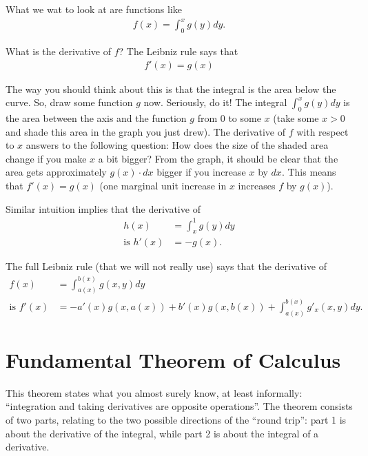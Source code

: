 \documentclass{article}
\begin{document}
What we wat to look at are functions like
\begin{align*}
	f(x) = \int_0^x g(y) dy.
\end{align*}

What is the derivative of $f$? The Leibniz rule says that
\begin{align*}
	f'(x)=g(x)
\end{align*}

The way you should think about this is that the integral is the area below the curve. So, draw some function $g$ now. Seriously, do it! The integral $\int_0^x g(y) dy$ is the area between the axis and the function $g$ from $0$ to some $x$ (take some $x > 0$ and shade this area in the graph you just drew). The derivative of $f$ with respect to $x$ answers to the following question: How does the size of the shaded area change if you make $x$ a bit bigger? From the graph, it should be clear that the area gets approximately $g(x) \cdot dx$ bigger if you increase $x$ by $dx$. This means that $f'(x) = g(x)$ (one marginal unit increase in $x$ increases $f$ by $g(x)$).

Similar intuition implies that the derivative of
\begin{align*}
	h(x) &= \int_x^1 g(y) dy
	\\
	\text{is }
	h'(x) &= -g(x).
\end{align*}

The full Leibniz rule (that we will not really use) says that the derivative of
\begin{align*}
	f(x) &= \int_{a(x)}^{b(x)} g(x,y) dy
	\\
	\text{is } f'(x) &= -a'(x)g(x,a(x)) + b'(x) g(x,b(x)) + \int_{a(x)}^{b(x)} g'_x(x,y) dy.
\end{align*}



\section{Fundamental Theorem of Calculus}

This theorem states what you almost surely know, at least informally: ``integration and taking derivatives are opposite operations''. The theorem consists of two parts, relating to the two possible directions of the ``round trip'': part 1 is about the derivative of the integral, while part 2 is about the integral of a derivative.
\end{document}
